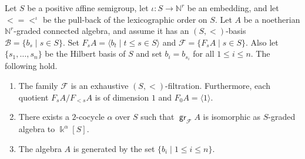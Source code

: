 \documentclass[11pt,fleqn]{article}
\newcommand\NN{\mathbb N}
\renewcommand\to{\longrightarrow}
\newcommand\B{\mathcal B}
\newcommand\F{\mathcal F}
\renewcommand\k{\Bbbk}
\DeclareMathOperator\gr{\mathsf{gr}}
\begin{document}
\begin{Lemma*}
Let $S$ be a positive affine semigroup, let $\iota: S \to \NN^r$ be an 
embedding, and let $< = <^\iota$ be the pull-back of the lexicographic order 
on $S$. Let $A$ be a noetherian $\NN^r$-graded connected algebra, and assume 
it has an $(S,<)$-basis $\B = \{b_s \mid s \in S\}$. Set $F_sA = \langle b_t 
\mid t \leq s \in S \rangle$ and $\F = \{F_sA \mid s \in S\}$. Also let 
$\{s_1, \ldots, s_n\}$ be the Hilbert basis of $S$ and set $b_i = b_{s_i}$ for 
all $1 \leq i \leq n$. The following hold.
\begin{enumerate}
\item The family $\F$ is an exhaustive $(S,<)$-filtration. Furthermore,
each quotient $F_sA / F_{<s}A$ is of dimension $1$ and $F_0A = \langle 1 
\rangle$.

\item There exists a $2$-cocycle $\alpha$ over $S$ such that $\gr_\F A$ is 
isomorphic as $S$-graded algebra to $\k^\alpha[S]$.

\item The algebra $A$ is generated by the set $\{b_i \mid 1 \leq i \leq n\}$.
\end{enumerate} 
\end{Lemma*}
\end{document}
